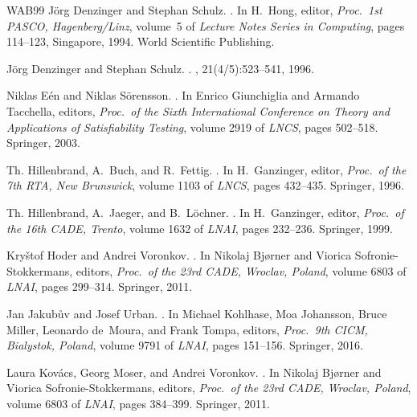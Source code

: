 \documentclass{report}
\begin{document}
\begin{thebibliography}{WAB{\etalchar{+}}99}
J{\"o}rg Denzinger and Stephan Schulz.
.
\newblock In H.~Hong, editor, {\em Proc.\ 1st PASCO, Hagenberg/Linz}, volume~5
  of {\em Lecture Notes Series in Computing}, pages 114--123, Singapore, 1994.
  World Scientific Publishing.

J{\"o}rg Denzinger and Stephan Schulz.
.
, 21(4/5):523--541, 1996.

Niklas E{\'e}n and Niklas S{\"o}rensson.
.
\newblock In Enrico Giunchiglia and Armando Tacchella, editors, {\em Proc.\ of
  the Sixth International Conference on Theory and Applications of
  Satisfiability Testing}, volume 2919 of {\em LNCS}, pages 502--518. Springer,
  2003.

Th. Hillenbrand, A.~Buch, and R.~Fettig.
.
\newblock In H.~Ganzinger, editor, {\em Proc.\ of the 7th RTA, New Brunswick},
  volume 1103 of {\em LNCS}, pages 432--435. Springer, 1996.

Th. Hillenbrand, A.~Jaeger, and B.~L{\"o}chner.
.
\newblock In H.~Ganzinger, editor, {\em Proc.\ of the 16th CADE, Trento},
  volume 1632 of {\em LNAI}, pages 232--236. Springer, 1999.

Kry\v{s}tof Hoder and Andrei Voronkov.
.
\newblock In Nikolaj Bj{\o}rner and Viorica Sofronie-Stokkermans, editors, {\em
  Proc.\ of the 23rd CADE, Wroclav, Poland}, volume 6803 of {\em LNAI}, pages
  299--314. Springer, 2011.

Jan Jakub{\r{u}}v and Josef Urban.
.
\newblock In Michael Kohlhase, Moa Johansson, Bruce Miller, Leonardo de~Moura,
  and Frank Tompa, editors, {\em Proc.\ 9th CICM, Bialystok, Poland}, volume
  9791 of {\em LNAI}, pages 151--156. Springer, 2016.

Laura Kov{\'a}cs, Georg Moser, and Andrei Voronkov.
.
\newblock In Nikolaj Bj{\o}rner and Viorica Sofronie-Stokkermans, editors, {\em
  Proc.\ of the 23rd CADE, Wroclav, Poland}, volume 6803 of {\em LNAI}, pages
  384--399. Springer, 2011.


\end{thebibliography}
\end{document}
